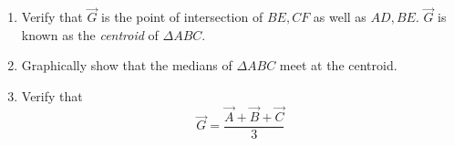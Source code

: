 \documentclass[journal,12pt,twocolumn]{IEEEtran}
\renewcommand\thesection{\arabic{section}}
\begin{document}
\begin{enumerate}[label=\thesection.\arabic*
,ref=\thesection.\theenumi]
%
\item
Verify that $\vec{G}$ is the point of intersection of $BE,CF$ as 
well as
$AD,BE$.  $\vec{G}$ is known as the {\em centroid} of $\Delta ABC$.
\item
Graphically show that the medians of $\Delta ABC$ meet at the centroid.
\item
Verify that
\begin{equation}
\vec{G} = \frac{\vec{A}+\vec{B}+\vec{C}}{3}
\end{equation}
\end{enumerate}
\end{document}
